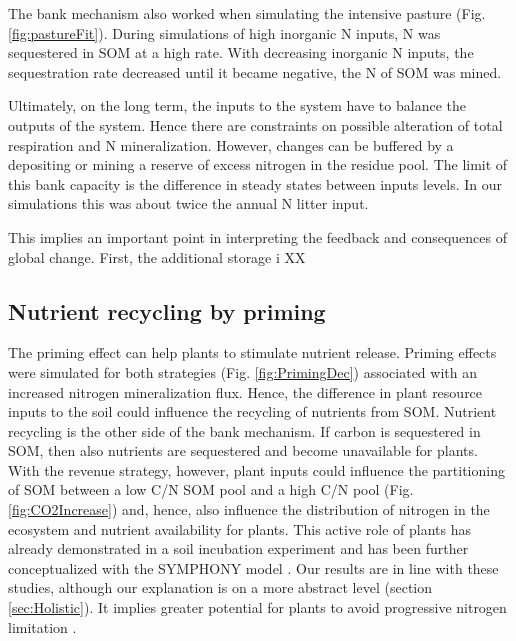 The bank mechanism also worked when simulating the intensive
pasture (Fig. \ref{fig:pastureFit}). During simulations of high inorganic
N inputs, N was sequestered in SOM at a high rate. With decreasing inorganic N
inputs, the sequestration rate decreased until it became negative, the N of SOM
was mined.
 
Ultimately, on the long term, the inputs to the system have to balance the
outputs of the system. Hence there are constraints on possible alteration of
total respiration and N mineralization. However, changes can be buffered by a 
depositing or mining a reserve of excess nitrogen in the residue pool.
The limit of this bank capacity is the difference in steady states between
inputs levels. In our simulations this was about twice the annual N
litter input. 

This implies an important point in interpreting the feedback and consequences
of global change.  First, the additional storage i XX

\subsection{Nutrient recycling by priming}
The priming effect can help plants to stimulate nutrient release.
Priming effects were simulated for both strategies (Fig. \ref{fig:PrimingDec})
associated with an increased nitrogen mineralization flux.
Hence, the difference in plant resource inputs to the soil could influence the
recycling of nutrients from SOM.
Nutrient recycling is the other side of the bank mechanism. If carbon is
sequestered in SOM, then also nutrients are sequestered and become unavailable
for plants.
With the revenue strategy, however, plant inputs could influence the
partitioning of SOM between a low C/N SOM pool and a high C/N pool (Fig.
\ref{fig:CO2Increase}) and, hence, also influence the distribution of nitrogen
in the ecosystem and nutrient availability for plants. This active role of
plants has already demonstrated in a soil incubation experiment
\citep{Fontaine11} and has been further conceptualized with the SYMPHONY model
\citep{Perveen14}. Our results are in line with these studies, although our
explanation is on a more abstract level (section \ref{sec:Holistic}). It implies
greater potential for plants to avoid progressive nitrogen limitation
\citep{Norby10, Franklin14, Averill15}.

